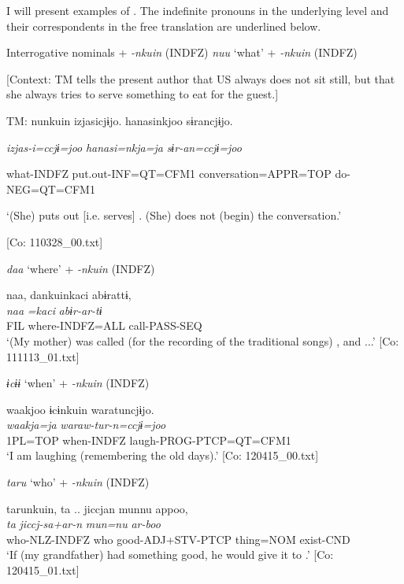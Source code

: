   I will present examples of . The indefinite pronouns in the underlying level and their correspondents in the free translation are underlined below.

\ea \label{ex:7:22}  Interrogative nominals + \textit{{}-nkuin} (INDFZ)
\ea \label{ex:7:22a}\textit{nuu} ‘what’ + \textit{{}-nkuin} (INDFZ)

    [Context: TM tells the present author that US always does not sit still, but that she always tries to serve something to eat for the guest.]

    TM:  nunkuin  izjasicjɨjo.  hanasinkjoo  sɨrancjɨjo.

      \textit{}  \textit{izjas-i=ccjɨ=joo}  \textit{hanasi=nkja=ja}  \textit{sɨr-an=ccjɨ=joo}
                                                                             
      what-INDFZ  put.out-INF=QT=CFM1  conversation=APPR=TOP                  do-NEG=QT=CFM1

      ‘(She) puts out [i.e. serves] . (She) does not (begin) the conversation.’

      [Co: 110328\_00.txt]

\ex \label{ex:7:22b}\textit{daa} ‘where’ + \textit{{}-nkuin} (INDFZ)

\glll  naa,  dankuinkaci  abɨrattɨ,\\
\textit{naa}  \textit{=kaci}  \textit{abɨr-ar-tɨ}\\
FIL  where-INDFZ=ALL  call-PASS-SEQ\\
\glt ‘(My mother) was called (for the recording of the traditional songs) , and ...’ [Co: 111113\_01.txt]

\ex \label{ex:7:22c}\textit{ɨcɨɨ} ‘when’ + \textit{{}-nkuin} (INDFZ)

\glll  waakjoo  ɨcɨnkuin  waratuncjɨjo.\\
\textit{waakja=ja}  \textit{}  \textit{waraw-tur-n=ccjɨ=joo}\\
1PL=TOP  when-INDFZ  laugh-PROG-PTCP=QT=CFM1\\
\glt ‘I am  laughing (remembering the old days).’ [Co: 120415\_00.txt]

\ex \label{ex:7:22d}\textit{taru} ‘who’ + \textit{{}-nkuin} (INDFZ)

\glll  tarunkuin,  ta ..  jiccjan  munnu  appoo,\\
\textit{}  \textit{ta}  \textit{jiccj-sa+ar-n}  \textit{mun=nu}  \textit{ar-boo}\\
who-NLZ-INDFZ  who  good-ADJ+STV-PTCP  thing=NOM  exist-CND\\
\glt ‘If (my grandfather) had something good, he would give it to .’ [Co: 120415\_01.txt]

